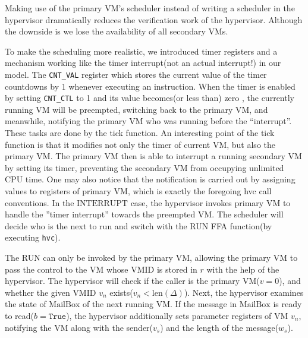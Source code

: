 \documentclass[a4paper]{article}
\newcommand*{\VMID}{\text{VMID}}
\newcommand*{\MB}{\text{MailBox}}
\newcommand*{\INT}{\text{INTERRUPT}}
\newcommand*{\instr}[1]{\texttt{#1}}
\begin{document}
Making use of the primary VM's scheduler instead of writing a scheduler in the
hypervisor dramatically reduces the verification work of the hypervisor. Although
the downside is we lose the availability of all secondary VMs.

To make the scheduling more realistic, we introduced timer registers and a
mechanism working like the timer interrupt(not an actual interrupt!) in our
model. The \texttt{CNT\_VAL} register which stores the current value of the
timer countdowns by $1$ whenever executing an instruction. When the timer is
enabled by setting \texttt{CNT\_CTL} to 1 and its value becomes(or less than)
zero , the currently running VM will be preempted, switching back to the primary
VM, and meanwhile, notifying the primary VM who was running before the
``interrupt''. These tasks are done by the tick function. An interesting point
of the tick function is that it modifies not only the timer of current VM, but
also the primary VM. The primary VM then is able to interrupt a running
secondary VM by setting its timer, preventing the secondary VM from occupying
unlimited CPU time. One may also notice that the notification is carried out by
assigning values to registers of primary VM, which is exactly the foregoing hvc
call conventions.
In the $\INT$ case, the hypervisor invokes primary VM to handle the ''timer
interrupt'' towards the preempted VM. The scheduler will decide who is the next
to run and switch with the RUN FFA function(by executing \instr{hvc}).


The RUN can only be invoked by the primary VM, allowing the primary VM to pass
the control to the VM whose $\VMID$ is stored in $r$ with the help of the
hypervisor. The hypervisor will check if the caller is the primary VM($v=0$),
and whether the given $\VMID$ $v_{n}$ exists($v_{n} < \text{len}(\Delta)$).
Next, the hypervisor examines the state of $\MB$ of the next running VM. If the
message in $\MB$ is ready to read($b=\mathtt{True}$), the hypervisor
additionally sets parameter registers of VM $v_{n}$, notifying the VM along with
the sender($v_{s}$) and the length of the message($w_{s}$).
\end{document}
